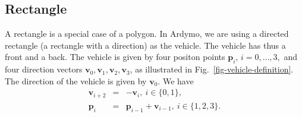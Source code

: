 \documentclass[11pt]{article}
\newcommand{\pb}{\mathbf{p}}
\newcommand{\vb}{\mathbf{v}}
\newcommand{\figref}[1]{Fig.~\eqref{#1}}
\begin{document}
\subsection{Rectangle}
\label{sec-rectangle}
A rectangle is a special case of a polygon. In Ardymo, we are using a directed
rectangle (a rectangle with a direction) as the vehicle. The vehicle has thus a
front and a back. The vehicle is given by four positon points
$\pb_i,\,i=0,\ldots,3,$ and four
direction vectors $\vb_0, \vb_1, \vb_2, \vb_3$, as illustrated in
\figref{fig-vehicle-definition}. The direction of the vehicle is given by
$\vb_0$. We have
\begin{eqnarray}
    \vb_{i+2} &=& -\vb_{i},\: i\in\{0,1\},\label{eq-v-v-rectangle} \\
    \pb_{i} &=& \pb_{i-1} + \vb_{i-1},\:i\in\{1,2,3\}.
\end{eqnarray}
\end{document}
